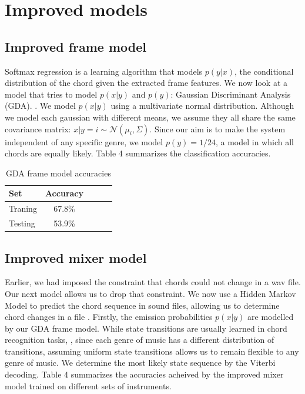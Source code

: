 \documentclass{article}
\begin{document}
\section{Improved models}
\subsection{Improved frame model}

Softmax regression is a learning algorithm that models $p(y|x)$, the conditional
distribution of the chord given the extracted frame features. We now look at a
model that tries to model $p(x|y)$ and $p(y)$: Gaussian Discriminant Analysis
(GDA). \cite{jiang}. We model $p(x|y)$ using a multivariate normal distribution.
Although we model each gaussian with different means, we assume they all share
the same covariance matrix: $x|y=i \sim \mathcal{N}$$(\mu_i, \Sigma)$. Since our
aim is to make the system independent of any specific genre, we model $p(y) =
1/24$, a model in which all chords are equally likely. Table 4 summarizes the classification accuracies.

\begin{table}[t]
\caption{GDA frame model accuracies}
\label{mfccvschroma}
\vskip 0.15in
\begin{center}
\begin{small}
\begin{sc}
\begin{tabular}{lcccr}
\hline
\abovespace\belowspace
Set & Accuracy \\
\hline
\abovespace
Traning & 67.8\%\\
Testing & 53.9\%\\
\hline
\end{tabular}
\end{sc}
\end{small}
\end{center}
\vskip -0.1in
\end{table}


\subsection{Improved mixer model}
Earlier, we had imposed the constraint that chords could not change in a wav
file. Our next model allows us to drop that constraint. We now use a Hidden
Markov Model to predict the chord sequence in sound files, allowing us to
determine chord changes in a file \cite{sheh}. Firstly, the emission
probabilities $p(x|y)$ are modelled by our GDA frame model. While state
transitions are usually learned in chord recognition tasks, \cite{lee}, since
each genre of music has a different distribution of transitions, assuming
uniform state transitions allows us to remain flexible to any genre of music. We
determine the most likely state sequence by the Viterbi decoding. Table 4
summarizes the accuracies acheived by the improved mixer model trained on
different sets of instruments.
\end{document}
